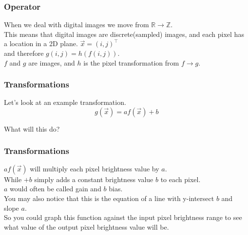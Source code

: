 \begin{frame}\frametitle{Operator}
When we deal with digital images we move from $\mathbb{R} \to \mathbb{Z}$. \\
\vspace{0.5cm}
This means that digital images are discrete(sampled) images, and each pixel has a location in a 2D plane. $\vec{x}=(i,j)^\top$ \\
and therefore $g(i,j) = h(f(i,j))$. \\
\vspace{0.5cm}
$f$ and $g$ are images, and $h$ is the pixel transformation from $f \to g$.
\end{frame}
\begin{frame}\frametitle{Transformations}
Let's look at an example transformation.
\begin{equation}
    g(\vec{x}) = af(\vec{x}) + b
    \label{af+b}
\end{equation}

What will this do?
\end{frame}

\begin{frame}\frametitle{Transformations}
$af(\vec{x})$ will multiply each pixel brightness value by $a$.\\ While $+b$ simply adds a constant brightness value $b$ to each pixel.\\ $a$ would often be called gain and $b$ bias.\\ You may also notice that this is the equation of a line with y-intersect $b$ and slope $a$. \\
\vspace{0.5cm}
So you could graph this function against the input pixel brightness range to see what value of the output pixel brightness value will be.
\end{frame}

